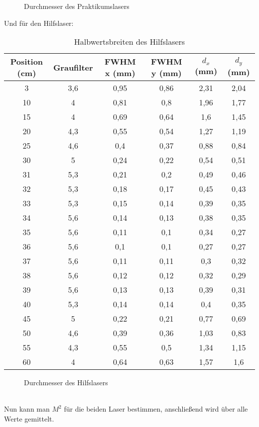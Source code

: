   \begin{figure}[h]
    \scalebox{0.9}{}
    \centering\caption{Durchmesser des Praktikumslasers}
  \end{figure}\newpage
Und für den Hilfslaser:
\begin{table}[h]
    \centering
      \begin{tabular}{cc|cccc}
        Position (cm)& Graufilter & FWHM x (mm) & FWHM y (mm) & $d_x$ (mm) & $d_y$ (mm) \\\hline
      3 & 3,6 & 0,95 & 0,86 & 2,31 & 2,04 \\
      10 & 4 & 0,81 & 0,8 & 1,96 & 1,77 \\
      15 & 4 & 0,69 & 0,64 & 1,6 & 1,45 \\
      20 & 4,3 & 0,55 & 0,54 & 1,27 & 1,19 \\
      25 & 4,6 & 0,4 & 0,37 & 0,88 & 0,84 \\
      30 & 5 & 0,24 & 0,22 & 0,54 & 0,51 \\
      31 & 5,3 & 0,21 & 0,2 & 0,49 & 0,46 \\
      32 & 5,3 & 0,18 & 0,17 & 0,45 & 0,43 \\
      33 & 5,3 & 0,15 & 0,14 & 0,39 & 0,35 \\
      34 & 5,6 & 0,14 & 0,13 & 0,38 & 0,35 \\
      35 & 5,6 & 0,11 & 0,1 & 0,34 & 0,27 \\
      36 & 5,6 & 0,1 & 0,1 & 0,27 & 0,27 \\
      37 & 5,6 & 0,11 & 0,11 & 0,3 & 0,32 \\
      38 & 5,6 & 0,12 & 0,12 & 0,32 & 0,29 \\
      39 & 5,6 & 0,13 & 0,13 & 0,39 & 0,31 \\
      40 & 5,3 & 0,14 & 0,14 & 0,4 & 0,35 \\
      45 & 5 & 0,22 & 0,21 & 0,77 & 0,69 \\
      50 & 4,6 & 0,39 & 0,36 & 1,03 & 0,83 \\
      55 & 4,3 & 0,55 & 0,5 & 1,34 & 1,15 \\
      60 & 4 & 0,64 & 0,63 & 1,57 & 1,6 \\
      \end{tabular}
      \caption{Halbwertsbreiten des Hilfslasers}
  \end{table}
  \begin{figure}[h]
    \centering\scalebox{0.9}{}
    \caption{Durchmesser des Hilfslasers}
  \end{figure}\\
Nun kann man $M^2$ für die beiden Laser bestimmen, anschließend wird über alle Werte gemittelt.
